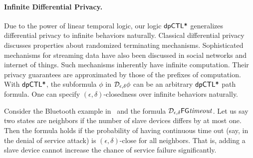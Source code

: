 \paragraph{Infinite Differential Privacy.}
Due to the power of linear temporal logic, our logic $\textsf{dpCTL*}$ generalizes differential privacy to infinite
behaviors naturally. Classical differential privacy discusses properties about
randomized terminating mechanisms. Sophisticated mechanisms for
streaming data have also been discussed in social networks and
internet of things. Such mechanisms inherently have infinite
computation. Their privacy guarantees are approximated by those of the
prefixes of computation.
With $\textsf{dpCTL*}$, the subformula $\phi$ in $\mathcal{D}_{{\epsilon}, {\delta}} \phi$
can be an arbitrary $\textsf{dpCTL*}$ path formula. One can specify
$(\epsilon, \delta)$-closedness over infinite behaviors naturally.

Consider the Bluetooth example in~\cite{prism-bluetooth-page} and the
formula $\mathcal{D}_{{\epsilon}, {\delta}}{\mathsf{F} \mathsf{G} \mathit{timeout}}$. Let us say
two states are neighbors if the number of slave devices differs by at
most one. Then the formula holds if the probability of having
continuous time out (say, in the denial of service attack) is
$(\epsilon, \delta)$-close for all neighbors. That is, adding a slave
device cannot increase the chance of service failure significantly.

